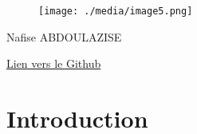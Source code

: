 \documentclass[12pt]{article}
\begin{document}
\begin{figure}[H]	\begin{subfigure}		\texttt{[image: ./media/image3.png]}
	\end{subfigure}
~	\begin{subfigure}		\texttt{[image: ./media/image4.png]}
	\end{subfigure}
~
\end{figure}



\par


\vspace{\baselineskip}



\begin{figure}[H]
	\begin{Center}
		\texttt{[image: ./media/image5.png]}
	\end{Center}
\end{figure}



\par


\vspace{\baselineskip}

\vspace{\baselineskip}

\vspace{\baselineskip}

\vspace{\baselineskip}

\vspace{\baselineskip}

\vspace{\baselineskip}

\vspace{\baselineskip}
{\fontsize{16pt}{19.2pt}\selectfont Nafise ABDOULAZISE\par}\par

\href{https://github.com/Nafisesalim/Scala-Implicit}{Lien vers le Github}

\section*{Introduction }
\end{document}
